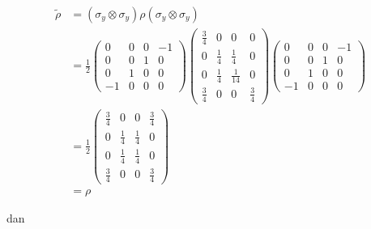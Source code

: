\begin{equation}
	\begin{aligned}
		\tilde{\rho} 
		&= (\sigma_y \otimes \sigma_y) \rho (\sigma_y \otimes \sigma_y)\\
		&= \frac{1}{2}
		\begin{pmatrix}
			0 & 0 & 0 & -1 \\
			0 & 0 & 1 & 0 \\
			0 & 1 & 0 & 0 \\
			-1 & 0 & 0 & 0
		\end{pmatrix}
		\begin{pmatrix}
			\frac{3}{4} & 0 & 0 & 0 \\
			0 & \frac{1}{4} & \frac{1}{4} & 0 \\
			0 & \frac{1}{4} & \frac{1}{14} & 0 \\
			\frac{3}{4} & 0 & 0 & \frac{3}{4}
		\end{pmatrix}
		\begin{pmatrix}
			0 & 0 & 0 & -1 \\
			0 & 0 & 1 & 0 \\
			0 & 1 & 0 & 0 \\
			-1 & 0 & 0 & 0
		\end{pmatrix}\\
		&= \frac{1}{2}
		\begin{pmatrix}
			\frac{3}{4}&0&0&\frac{3}{4}\\
			0&\frac{1}{4}&\frac{1}{4}&0\\
			0&\frac{1}{4}&\frac{1}{4}&0\\
			\frac{3}{4}&0&0&\frac{3}{4}
		\end{pmatrix}\\
		&=\rho
	\end{aligned}
\end{equation}

dan

